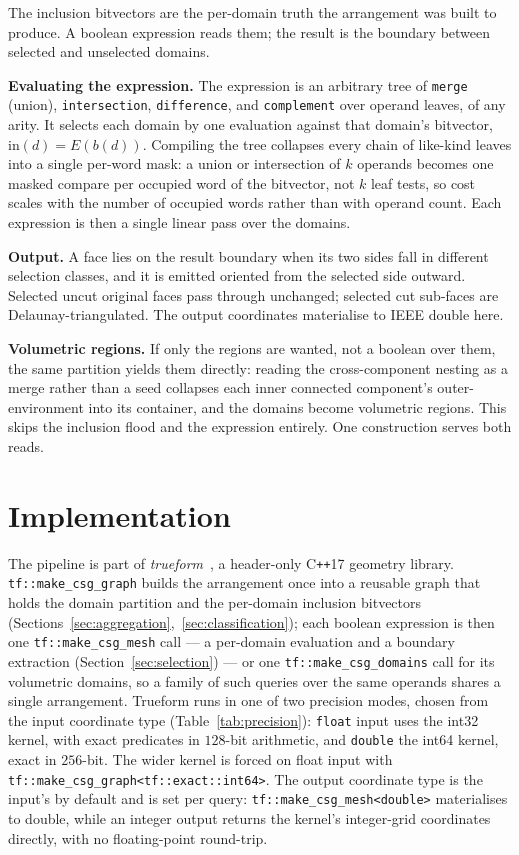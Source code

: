 \documentclass{egpubl}
\begin{document}
The inclusion bitvectors are the per-domain truth the arrangement was built to produce. A boolean expression reads them; the result is the boundary between selected and unselected domains.

\textbf{Evaluating the expression.} The expression is an arbitrary tree of \texttt{merge} (union), \texttt{intersection}, \texttt{difference}, and \texttt{complement} over operand leaves, of any arity. It selects each domain by one evaluation against that domain's bitvector, $\text{in}(d) = E(b(d))$. Compiling the tree collapses every chain of like-kind leaves into a single per-word mask: a union or intersection of $k$ operands becomes one masked compare per occupied word of the bitvector, not $k$ leaf tests, so cost scales with the number of occupied words rather than with operand count. Each expression is then a single linear pass over the domains.

\textbf{Output.} A face lies on the result boundary when its two sides fall in different selection classes, and it is emitted oriented from the selected side outward. Selected uncut original faces pass through unchanged; selected cut sub-faces are Delaunay-triangulated. The output coordinates materialise to IEEE double here.

\textbf{Volumetric regions.} If only the regions are wanted, not a boolean over them, the same partition yields them directly: reading the cross-component nesting as a merge rather than a seed collapses each inner connected component's outer-environment into its container, and the domains become volumetric regions. This skips the inclusion flood and the expression entirely. One construction serves both reads.

\section{Implementation}
\label{sec:implementation}

The pipeline is part of \emph{trueform}~\cite{trueform2025}, a header-only C\texttt{++}17 geometry library. \texttt{tf::make\_csg\_graph} builds the arrangement once into a reusable graph that holds the domain partition and the per-domain inclusion bitvectors (Sections~\ref{sec:aggregation},~\ref{sec:classification}); each boolean expression is then one \texttt{tf::make\_csg\_mesh} call --- a per-domain evaluation and a boundary extraction (Section~\ref{sec:selection}) --- or one \texttt{tf::make\_csg\_domains} call for its volumetric domains, so a family of such queries over the same operands shares a single arrangement. Trueform runs in one of two precision modes, chosen from the input coordinate type (Table~\ref{tab:precision}): \texttt{float} input uses the int32 kernel, with exact predicates in $128$-bit arithmetic, and \texttt{double} the int64 kernel, exact in $256$-bit. The wider kernel is forced on float input with \texttt{tf::make\_csg\_graph<tf::exact::int64>}. The output coordinate type is the input's by default and is set per query: \texttt{tf::make\_csg\_mesh<double>} materialises to double, while an integer output returns the kernel's integer-grid coordinates directly, with no floating-point round-trip.
\end{document}
